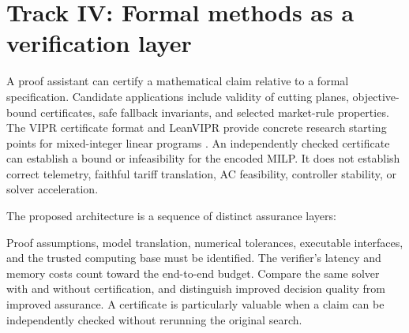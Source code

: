 \documentclass[11pt,letterpaper]{article}
\begin{document}
\section{Track IV: Formal methods as a verification layer}
A proof assistant can certify a mathematical claim relative to a formal specification. Candidate applications include validity of cutting planes, objective-bound certificates, safe fallback invariants, and selected market-rule properties. The VIPR certificate format and LeanVIPR provide concrete research starting points for mixed-integer linear programs \cite{vipr,leanvipr}. An independently checked certificate can establish a bound or infeasibility for the encoded MILP. It does not establish correct telemetry, faithful tariff translation, AC feasibility, controller stability, or solver acceleration.

The proposed architecture is a sequence of distinct assurance layers:
\begin{center}
\end{center}
Proof assumptions, model translation, numerical tolerances, executable interfaces, and the trusted computing base must be identified. The verifier's latency and memory costs count toward the end-to-end budget. Compare the same solver with and without certification, and distinguish improved decision quality from improved assurance. A certificate is particularly valuable when a claim can be independently checked without rerunning the original search.
\end{document}
